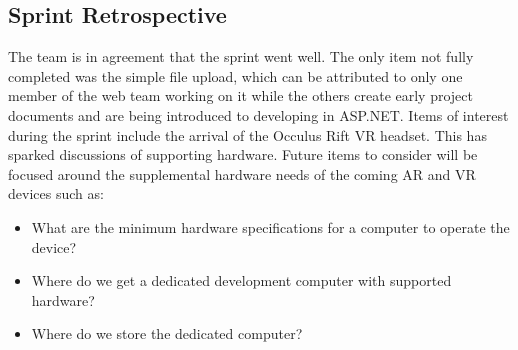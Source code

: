     \subsection{Sprint Retrospective}
    \label{sec:Sprint1_retrospective}
        \hspace{7mm}
        The team is in agreement that the sprint went well.  The only item not fully completed was the simple
        file upload, which can be attributed to only one member of the web team working on it while the others
        create early project documents and are being introduced to developing in ASP.NET.  Items of interest 
        during the sprint include the arrival of the Occulus Rift VR headset.  This has sparked discussions of
        supporting hardware.  Future items to consider will be focused around the supplemental hardware needs 
        of the coming AR and VR devices such as:
        \begin{itemize}
            \item What are the minimum hardware specifications for a computer to operate the device?
            \item Where do we get a dedicated development computer with supported hardware?
            \item Where do we store the dedicated computer? 
        \end{itemize}
